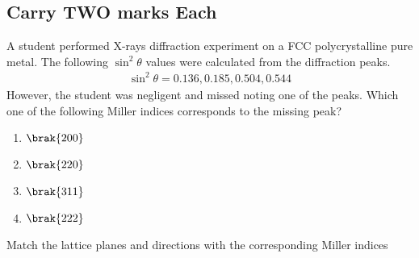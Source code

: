 \iffalse
\author{EE24BTECH11049}
\section{xe}
\chapter{2023}
\fi

\subsection{Carry TWO marks Each}
	\item A student performed X-rays diffraction experiment on a FCC polycrystalline pure metal. The following $\sin^{2}{\theta}$ values were calculated from the diffraction peaks. 
		\begin{align*}
			\sin^{2}{\theta} = 0.136, 0.185, 0.504, 0.544
		\end{align*}
	However, the student was negligent and missed noting one of the peaks. Which one of the following Miller indices corresponds to the missing peak? 
		
		\hfill{}

		\begin{multicols}{4}
			\begin{enumerate}
				\item $\brak{200}$
				\item $\brak{220}$
				\item $\brak{311}$
				\item $\brak{222}$
			\end{enumerate}
		\end{multicols}

	\item Match the lattice planes and directions  with the corresponding Miller indices 

